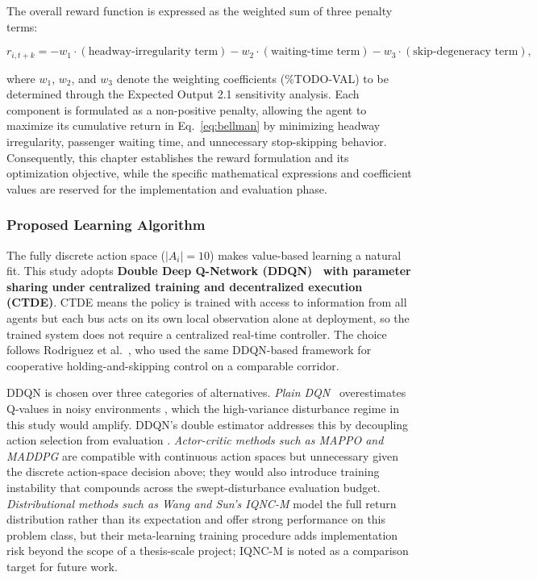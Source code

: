 The overall reward function is expressed as the weighted sum of three penalty terms:

\begin{equation}
r_{i,t+k} = -w_1 \cdot (\text{headway-irregularity term}) - w_2 \cdot (\text{waiting-time term}) - w_3 \cdot (\text{skip-degeneracy term}),
\label{eq:reward-form}
\end{equation}

where $w_1$, $w_2$, and $w_3$ denote the weighting coefficients (\%TODO-VAL) to be determined through the Expected Output 2.1 sensitivity analysis. Each component is formulated as a non-positive penalty, allowing the agent to maximize its cumulative return in Eq.~\eqref{eq:bellman} by minimizing headway irregularity, passenger waiting time, and unnecessary stop-skipping behavior. Consequently, this chapter establishes the reward formulation and its optimization objective, while the specific mathematical expressions and coefficient values are reserved for the implementation and evaluation phase.

\subsubsection{Proposed Learning Algorithm}
\label{subsec:proposed-algorithm}

The fully discrete action space ($|A_i| = 10$) makes value-based learning a natural fit. This study adopts \textbf{Double Deep Q-Network (DDQN)~\cite{vanHasselt2016DDQN} with parameter sharing under centralized training and decentralized execution (CTDE)}. CTDE means the policy is trained with access to information from all agents but each bus acts on its own local observation alone at deployment, so the trained system does not require a centralized real-time controller. The choice follows Rodriguez et al.~\cite{Rodriguez2023Cooperative}, who used the same DDQN-based framework for cooperative holding-and-skipping control on a comparable corridor.

DDQN is chosen over three categories of alternatives. \textit{Plain DQN}~\cite{Mnih2015DQN} overestimates Q-values in noisy environments \cite{vanHasselt2016DDQN,Henderson2018Matters}, which the high-variance disturbance regime in this study would amplify. DDQN's double estimator addresses this by decoupling action selection from evaluation \cite{vanHasselt2016DDQN}. \textit{Actor-critic methods such as MAPPO and MADDPG} are compatible with continuous action spaces but unnecessary given the discrete action-space decision above; they would also introduce training instability that compounds across the swept-disturbance evaluation budget. \textit{Distributional methods such as Wang and Sun's IQNC-M} \cite{Wangsun} model the full return distribution rather than its expectation and offer strong performance on this problem class, but their meta-learning training procedure adds implementation risk beyond the scope of a thesis-scale project; IQNC-M is noted as a comparison target for future work.

